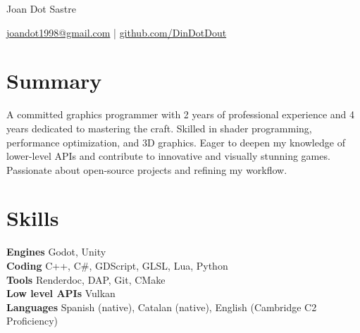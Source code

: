 \documentclass[10pt]{article}       %
\begin{document}
\centerline{\Huge Joan Dot Sastre}

\vspace{5pt}

\centerline{\href{mailto:joandot1998@gmail.com}{joandot1998@gmail.com} | \href{https://github.com/DinDotDout}{github.com/DinDotDout}}

\vspace{-10pt}
\section*{Summary}
A committed graphics programmer with 2 years of professional experience and 4 years dedicated to mastering the craft. Skilled in shader programming, performance optimization, and 3D graphics. Eager to deepen my knowledge of lower-level APIs and contribute to innovative and visually stunning games. Passionate about open-source projects and refining my workflow.
\section*{Skills}
\textbf{Engines} Godot, Unity \\
\textbf{Coding} C++, C\#, GDScript, GLSL, Lua, Python \\
\textbf{Tools} Renderdoc, DAP, Git, CMake \\
\textbf{Low level APIs} Vulkan \\
\textbf{Languages} Spanish (native), Catalan (native), English (Cambridge C2 Proficiency)

\vspace{-6.5pt}
\end{document}
